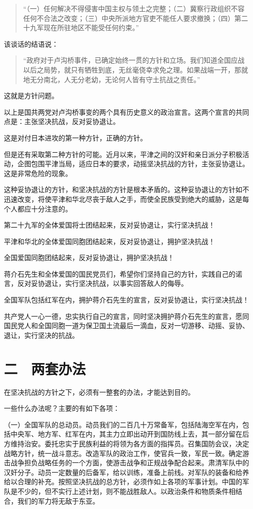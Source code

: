 \begin{quote}
“（一）任何解决不得侵害中国主权与领土之完整；（二）冀察行政组织不容任何不合法之改变；（三）中央所派地方官吏不能任人要求撤换；（四）第二十九军现在所驻地区不能受任何约束。”
\end{quote}

该谈话的结语说：

\begin{quote}
“政府对于卢沟桥事件，已确定始终一贯的方针和立场。我们知道全国应战以后之局势，就只有牺牲到底，无丝毫侥幸求免之理。如果战端一开，那就地无分南北，人无分老幼，无论何人皆有守土抗战之责任。”
\end{quote}

这就是方针问题。

以上是国共两党对卢沟桥事变的两个具有历史意义的政治宣言。这两个宣言的共同点是：主张坚决抗战，反对妥协退让。

这是对付日本进攻的第一种方针，正确的方针。

但是还有采取第二种方针的可能。近月以来，平津之间的汉奸和亲日派分子积极活动，企图包围平津当局，适应日本的要求，动摇坚决抗战的方针，主张妥协退让。这是非常危险的现象。

这种妥协退让的方针，和坚决抗战的方针是根本矛盾的。这种妥协退让的方针如不迅速改变，将使平津和华北尽丧于敌人之手，而使全民族受到绝大的威胁，这是每个人都应十分注意的。

第二十九军的全体爱国将士团结起来，反对妥协退让，实行坚决抗战！

平津和华北的全体爱国同胞团结起来，反对妥协退让，拥护坚决抗战！

全国爱国同胞团结起来，反对妥协退让，拥护坚决抗战！

蒋介石先生和全体爱国的国民党员们，希望你们坚持自己的方针，实践自己的诺言，反对妥协退让，实行坚决抗战，以事实回答敌人的侮辱。

全国军队包括红军在内，拥护蒋介石先生的宣言，反对妥协退让，实行坚决抗战！

共产党人一心一德，忠实执行自己的宣言，同时坚决拥护蒋介石先生的宣言，愿同国民党人和全国同胞一道为保卫国土流最后一滴血，反对一切游移、动摇、妥协、退让，实行坚决的抗战。

\section{二　两套办法}

在坚决抗战的方针之下，必须有一整套的办法，才能达到目的。

一些什么办法呢？主要的有如下各项：

（一）全国军队的总动员。动员我们的二百几十万常备军，包括陆海空军在内，包括中央军、地方军、红军在内，其主力立即出动开到国防线上去，其一部分留在后方维持治安。委托忠实于民族利益的将领为各方面的指挥员。召集国防会议，决定战略方针，统一战斗意志。改造军队的政治工作，使官兵一致，军民一致。确定游击战争担负战略任务的一个方面，使游击战争和正规战争配合起来。肃清军队中的汉奸分子。动员一定数量的后备军，给以训练，准备上前线。对军队的装备和给养给以合理的补充。按照坚决抗战的总方针，必须作如上各项的军事计划。中国的军队是不少的，但不实行上述计划，则不能战胜敌人。以政治条件和物质条件相结合，我们的军力将无敌于东亚。


